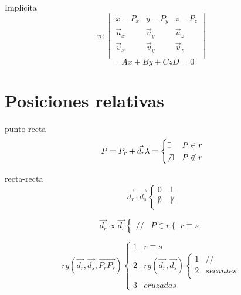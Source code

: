 \documentclass[12pt, letterpaper, twoside]{article}
\begin{document}
	
	Implícita
	\begin{equation}
		\pi :
		\begin{vmatrix}
			x - P_x   & y - P_y   & z - P_z   \\
			\vec{u}_x & \vec{u}_y & \vec{u}_z \\
			\vec{v}_x & \vec{v}_y & \vec{v}_z \\
		\end{vmatrix}
	\end{equation}
	\begin{equation}
		= Ax + By + Cz  D = 0
	\end{equation}


	\section{Posiciones relativas}
	
	punto-recta
	\begin{equation}
		P = P_r + \vec{d_r} \lambda =
		\begin{cases}
			\exists     & P \in r    \\
			\not\exists & P \not\in r \\
		\end{cases}
	\end{equation}

	recta-recta
	\begin{equation}
		\vec{d_r} \cdot \vec{d_s}
		\begin{cases}
			0     & \perp     \\
			\not0 & \not\perp \\
		\end{cases}
	\end{equation}

	\begin{equation}
		\vec{d_r} \propto \vec{d_s}
		\begin{cases}
			// & P \in r
			\begin{cases}
				r \equiv s
			\end{cases}
		\end{cases}
	\end{equation}

	\begin{equation}
		rg(\vec{d_r}, \vec{d_s}, \vec{P_r P_s})
		\begin{cases}
			1     & r \equiv s     \\
			2     & rg(\vec{d_r}, \vec{d_s})
			\begin{cases}
				1     & //       \\
				2     & secantes \\
			\end{cases} \\
			3     & cruzadas
		\end{cases}
	\end{equation}
	
\end{document}
